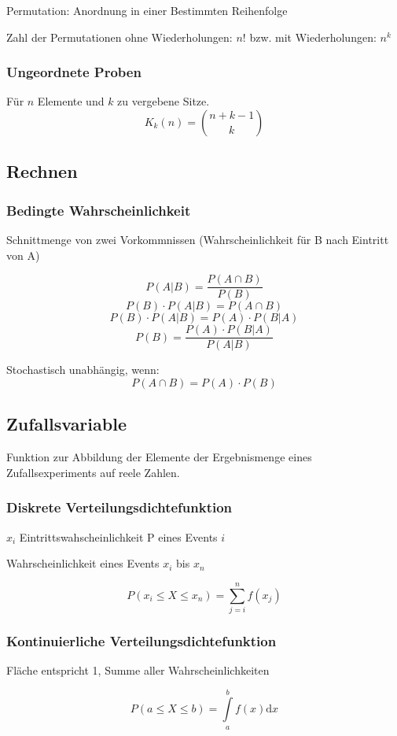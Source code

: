 Permutation: Anordnung in einer Bestimmten Reihenfolge

Zahl der Permutationen ohne Wiederholungen: $n!$ bzw. mit Wiederholungen: $n^k$

\subsubsection{Ungeordnete Proben}

Für $n$ Elemente und $k$ zu vergebene Sitze.
\[
	K_k(n) = \binom{n + k -1}{k}
\]

\subsection{Rechnen}

\subsubsection{Bedingte Wahrscheinlichkeit}

Schnittmenge von zwei Vorkommnissen (Wahrscheinlichkeit für B nach Eintritt von A)

\[
	P(A|B) = \frac{P(A \cap B)}{P(B)}
\]
\[
	P(B) \cdot P(A|B) = P(A \cap B)
\]
\[
	P(B) \cdot P(A|B) = P(A) \cdot P(B|A)
\]
\[
	P(B) = \frac{P(A) \cdot P(B | A)}{P(A|B)}
\]

Stochastisch unabhängig, wenn:
\[
	P(A \cap B) = P(A) \cdot P(B)
\]


\subsection{Zufallsvariable}

Funktion zur Abbildung der Elemente der Ergebnismenge eines Zufallsexperiments auf reele Zahlen.

\subsubsection{Diskrete Verteilungsdichtefunktion}

$x_i$ Eintrittswahscheinlichkeit P eines Events $i$

Wahrscheinlichkeit eines Events $x_i$ bis $x_n$

\[
P(x_i \leq X \leq x_n) = \sum^n_{j=i}{f(x_j)}
\]

\subsubsection{Kontinuierliche Verteilungsdichtefunktion}

Fläche entspricht 1, Summe aller Wahrscheinlichkeiten

\[
P(a \leq X \leq b) = \int\limits^b_a{f(x)\mathrm{d}x}
\]


